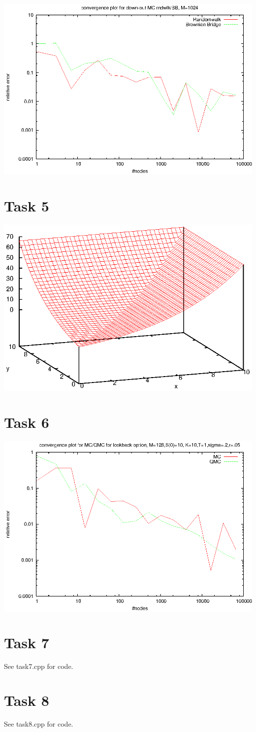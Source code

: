 \documentclass[]{article}
\begin{document}
\includegraphics[width=.9\textwidth]{task4_mc_1024.eps}\\

\section*{Task 5}
\includegraphics[width=.9\textwidth]{task5.eps}\\

\section*{Task 6}
\includegraphics[width=.9\textwidth]{task6.eps}\\

\section*{Task 7}
See task7.cpp for code.

\section*{Task 8}
See task8.cpp for code.
\end{document}
